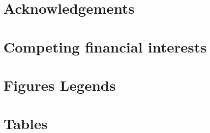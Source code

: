 \documentclass[english]{article}
\begin{document}
\section*{Acknowledgements}


\section*{Competing financial interests}


\section*{Figures Legends}


\section*{Tables}
\end{document}
